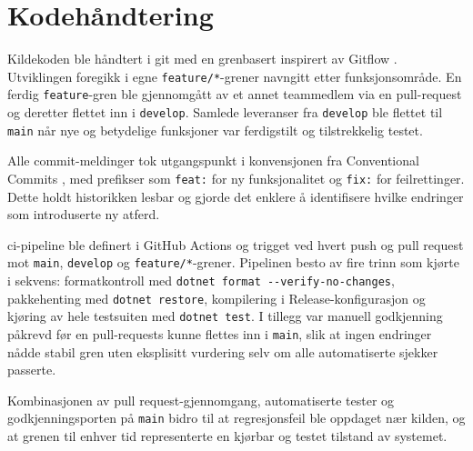 \section{Kodehåndtering}
\label{sec:uvikling-struktur}

Kildekoden ble håndtert i \Gls{git} med en \gls{grenbasert} inspirert av Gitflow \cite{gitflow}. Utviklingen foregikk i egne \texttt{feature/*}-grener navngitt etter funksjonsområde. En ferdig \texttt{feature}-gren ble gjennomgått av et annet teammedlem via en \gls{pull-request} og deretter flettet inn i \texttt{develop}. Samlede leveranser fra \texttt{develop} ble flettet til \texttt{main} når nye og betydelige funksjoner var ferdigstilt og tilstrekkelig testet.

Alle commit-meldinger tok utgangspunkt i konvensjonen fra Conventional Commits \cite{conventionalcommits}, med prefikser som \texttt{feat:} for ny funksjonalitet og \texttt{fix:} for feilrettinger. Dette holdt historikken lesbar og gjorde det enklere å identifisere hvilke endringer som introduserte ny atferd.

\Gls{ci-pipeline} ble definert i GitHub Actions og trigget ved hvert push og pull request mot \texttt{main}, \texttt{develop} og \texttt{feature/*}-grener. Pipelinen besto av fire trinn som kjørte i sekvens: formatkontroll med \texttt{dotnet format -{}-verify-no-changes}, pakkehenting med \texttt{dotnet restore}, kompilering i Release-konfigurasjon og kjøring av hele testsuiten med \texttt{dotnet test}. I tillegg var manuell godkjenning påkrevd før en pull-requests kunne flettes inn i \texttt{main}, slik at ingen endringer nådde stabil gren uten eksplisitt vurdering selv om alle automatiserte sjekker passerte.

Kombinasjonen av pull request-gjennomgang, automatiserte tester og godkjenningsporten på \texttt{main} bidro til at \gls{regresjonsfeil} ble oppdaget nær kilden, og at grenen til enhver tid representerte en kjørbar og testet tilstand av systemet.